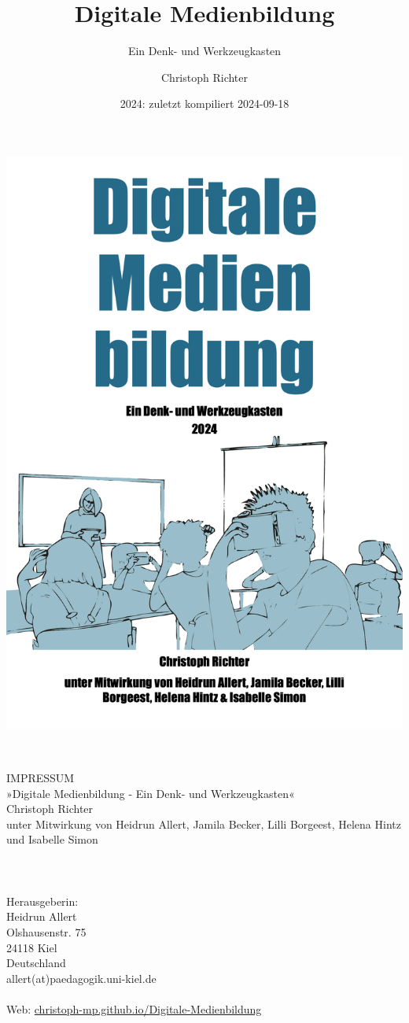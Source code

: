 \documentclass[
  a4paper,
]{book}
\title{Digitale Medienbildung}
\subtitle{Ein Denk- und Werkzeugkasten}
\author{Christoph Richter}
\date{2024: zuletzt kompiliert 2024-09-18}
\begin{document}
\maketitle


\includegraphics[width=\textwidth, height=0.99\textheight]{Figures/Cover.png}


\newpage
~\vfill
\thispagestyle{empty}

\noindent IMPRESSUM\\
\noindent »Digitale Medienbildung - Ein Denk- und Werkzeugkasten«\\
\noindent Christoph Richter\\
\noindent unter Mitwirkung von Heidrun Allert, Jamila Becker, Lilli Borgeest, Helena Hintz und Isabelle Simon\\
\\
\\
\\
\noindent Herausgeberin:\\
Heidrun Allert\\
Olshausenstr. 75\\
24118 Kiel\\
Deutschland\\
allert(at)paedagogik.uni-kiel.de\\
\\
\noindent Web: \href{https://christoph-mp.github.io/Digitale-Medienbildung/}{christoph-mp.github.io/Digitale-Medienbildung}\\ %
\end{document}
